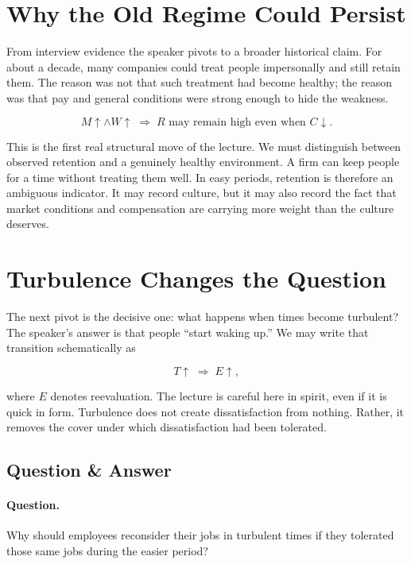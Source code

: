 \section{Why the Old Regime Could Persist}

From interview evidence the speaker pivots to a broader historical claim. For about a decade, many companies could treat people impersonally and still retain them. The reason was not that such treatment had become healthy; the reason was that pay and general conditions were strong enough to hide the weakness.

\begin{equation}
M \uparrow \land W \uparrow \;\Rightarrow\; R \text{ may remain high even when } C \downarrow .
\end{equation}

This is the first real structural move of the lecture. We must distinguish between observed retention and a genuinely healthy environment. A firm can keep people for a time without treating them well. In easy periods, retention is therefore an ambiguous indicator. It may record culture, but it may also record the fact that market conditions and compensation are carrying more weight than the culture deserves.

\section{Turbulence Changes the Question}

The next pivot is the decisive one: what happens when times become turbulent? The speaker's answer is that people ``start waking up.'' We may write that transition schematically as

\begin{equation}
T \uparrow \;\Rightarrow\; E \uparrow ,
\end{equation}

where \(E\) denotes reevaluation. The lecture is careful here in spirit, even if it is quick in form. Turbulence does not create dissatisfaction from nothing. Rather, it removes the cover under which dissatisfaction had been tolerated.

\subsection{Question \& Answer}

\paragraph{Question.} Why should employees reconsider their jobs in turbulent times if they tolerated those same jobs during the easier period?

